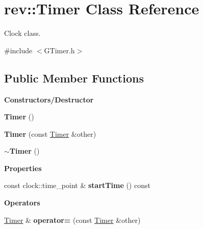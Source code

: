 \hypertarget{classrev_1_1_timer}{}\section{rev\+::Timer Class Reference}
\label{classrev_1_1_timer}


Clock class.  




{\ttfamily \#include $<$G\+Timer.\+h$>$}

\subsection*{Public Member Functions}
\begin{Indent}\textbf{ Constructors/\+Destructor}\par
\begin{DoxyCompactItemize}
\item 
\mbox{\label{classrev_1_1_timer_a65dfcdf213c3f644fcf0d87e2b82404c}} 
{\bfseries Timer} ()
\item 
\mbox{\label{classrev_1_1_timer_a21f0b29a2a6d6483c5b20c66e5522240}} 
{\bfseries Timer} (const \mbox{\hyperlink{classrev_1_1_timer}{Timer}} \&other)
\item 
\mbox{\label{classrev_1_1_timer_a0f7186567b42106a4a71ccdb859ca266}} 
{\bfseries $\sim$\+Timer} ()
\end{DoxyCompactItemize}
\end{Indent}
\begin{Indent}\textbf{ Properties}\par
\begin{DoxyCompactItemize}
\item 
\mbox{\label{classrev_1_1_timer_ad4265522ee6022a219f12a50a06c0112}} 
const clock\+::time\+\_\+point \& {\bfseries start\+Time} () const
\end{DoxyCompactItemize}
\end{Indent}
\begin{Indent}\textbf{ Operators}\par
\begin{DoxyCompactItemize}
\item 
\mbox{\label{classrev_1_1_timer_ac7d5015b2c1e2a3fbd7a7b842116aa65}} 
\mbox{\hyperlink{classrev_1_1_timer}{Timer}} \& {\bfseries operator=} (const \mbox{\hyperlink{classrev_1_1_timer}{Timer}} \&other)
\end{DoxyCompactItemize}
\end{Indent}
